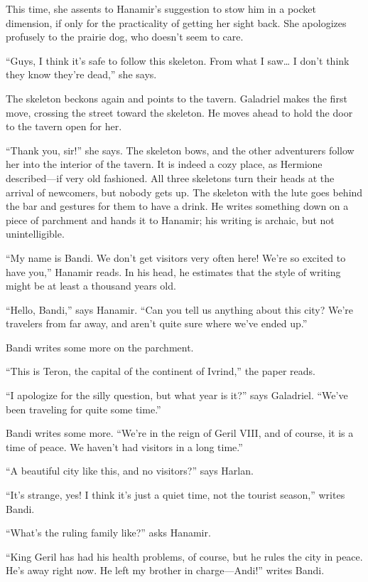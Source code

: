 \documentclass[smalldemyvopaper,11pt,twoside,onecolumn,openright,extrafontsizes]{memoir}
\begin{document}
This time, she assents to Hanamir's suggestion to stow him in a pocket
dimension, if only for the practicality of getting her sight back. She
apologizes profusely to the prairie dog, who doesn't seem to care.

``Guys, I think it's safe to follow this skeleton. From what I
saw\ldots{} I don't think they know they're dead,'' she says.

The skeleton beckons again and points to the tavern. Galadriel makes the
first move, crossing the street toward the skeleton. He moves ahead to
hold the door to the tavern open for her.

``Thank you, sir!'' she says. The skeleton bows, and the other
adventurers follow her into the interior of the tavern. It is indeed a
cozy place, as Hermione described---if very old fashioned. All three
skeletons turn their heads at the arrival of newcomers, but nobody gets
up. The skeleton with the lute goes behind the bar and gestures for them
to have a drink. He writes something down on a piece of parchment and
hands it to Hanamir; his writing is archaic, but not unintelligible.

``My name is Bandi. We don't get visitors very often here! We're so
excited to have you,'' Hanamir reads. In his head, he estimates that the
style of writing might be at least a thousand years old.

``Hello, Bandi,'' says Hanamir. ``Can you tell us anything about this
city? We're travelers from far away, and aren't quite sure where we've
ended up.''

Bandi writes some more on the parchment.

``This is Teron, the capital of the continent of Ivrind,'' the paper
reads.

``I apologize for the silly question, but what year is it?'' says
Galadriel. ``We've been traveling for quite some time.''

Bandi writes some more. ``We're in the reign of Geril VIII, and of
course, it is a time of peace. We haven't had visitors in a long time.''

``A beautiful city like this, and no visitors?'' says Harlan.

``It's strange, yes! I think it's just a quiet time, not the tourist
season,'' writes Bandi.

``What's the ruling family like?'' asks Hanamir.

``King Geril has had his health problems, of course, but he rules the
city in peace. He's away right now. He left my brother in
charge---Andi!'' writes Bandi.
\end{document}
